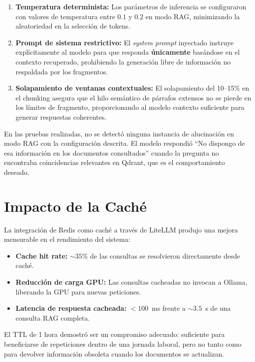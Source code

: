 \begin{enumerate}
    \item \textbf{Temperatura determinista:} Los parámetros de inferencia se configuraron con valores de temperatura entre $0.1$ y $0.2$ en modo RAG, minimizando la aleatoriedad en la selección de tokens.

    \item \textbf{Prompt de sistema restrictivo:} El \textit{system prompt} inyectado instruye explícitamente al modelo para que responda \textbf{únicamente} basándose en el contexto recuperado, prohibiendo la generación libre de información no respaldada por los fragmentos.

    \item \textbf{Solapamiento de ventanas contextuales:} El solapamiento del 10--15\% en el chunking asegura que el hilo semántico de párrafos extensos no se pierde en los límites de fragmento, proporcionando al modelo contexto suficiente para generar respuestas coherentes.
\end{enumerate}

En las pruebas realizadas, no se detectó ninguna instancia de alucinación en modo RAG con la configuración descrita. El modelo respondió ``No dispongo de esa información en los documentos consultados'' cuando la pregunta no encontraba coincidencias relevantes en Qdrant, que es el comportamiento deseado.

\section{Impacto de la Caché}

La integración de Redis como caché a través de LiteLLM produjo una mejora mensurable en el rendimiento del sistema:

\begin{itemize}
    \item \textbf{Cache hit rate:} $\sim 35$\% de las consultas se resolvieron directamente desde caché.
    \item \textbf{Reducción de carga GPU:} Las consultas cacheadas no invocan a Ollama, liberando la GPU para nuevas peticiones.
    \item \textbf{Latencia de respuesta cacheada:} $< 100$~ms frente a $\sim 3.5$~s de una consulta RAG completa.
\end{itemize}

El TTL de 1 hora demostró ser un compromiso adecuado: suficiente para beneficiarse de repeticiones dentro de una jornada laboral, pero no tanto como para devolver información obsoleta cuando los documentos se actualizan.
